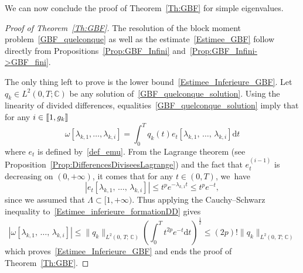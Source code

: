 \documentclass[11pt]{article}
\theoremstyle{definition}
\numberwithin{equation}{section}
\numberwithin{figure}{section}
\numberwithin{table}{section}
\newcommand{\llbracket}{\mathopen{[\mkern -2.7mu[}}
\newcommand{\rrbracket}{\mathclose{]\mkern -2.7mu]}}
\newcommand{\inter}[2]{\llbracket #1,#2 \rrbracket}
\newcommand{\n}{g}
\newcommand{\C}{\mathbb{C}}
\newcommand{\md}{\mathrm{d}}
\begin{document}
We can now conclude the proof of Theorem~\ref{Th:GBF} for simple eigenvalues.
\begin{proof}[Proof of Theorem~\ref{Th:GBF}]
The resolution of the block moment problem~\eqref{GBF_quelconque} as well as the estimate~\eqref{Estimee_GBF} follow directly from Propositions~\ref{Prop:GBF_Infini} and~\ref{Prop:GBF_Infini->GBF_fini}.

The only thing left to prove is the lower bound~\eqref{Estimee_Inferieure_GBF}. Let $q_k \in L^2(0,T;\C)$ be any solution of~\eqref{GBF_quelconque_solution}. Using the linearity of divided differences, equalities~\eqref{GBF_quelconque_solution} imply that for any $i \in \inter{1}{\n_k}$
\begin{equation}\label{Estimee_inferieure_formationDD}
\omega[\lambda_{k,1}, \dots, \lambda_{k,i}] = \int_0^T q_k(t) e_t[\lambda_{k,1},\,\dots,\, \lambda_{k,i}] \md t
\end{equation}
where $e_t$ is defined by~\eqref{def_emu}. From the Lagrange theorem (see Proposition~\ref{Prop:DifferencesDiviseesLagrange}) and the fact that $e_t^{(i-1)}$ is decreasing on $(0,+\infty)$, it comes that for any $t \in (0,T)$, we~have
\[
\left| e_t[\lambda_{k,1},\,\dots,\, \lambda_{k,i}] \right|\leq t^p e^{-\lambda_{k,1} t} \leq t^p e^{-t},
\]
since we assumed that $\Lambda\subset [1,+\infty)$. Thus applying the Cauchy--Schwarz inequality to~\eqref{Estimee_inferieure_formationDD} gives
\[
\left| \omega[\lambda_{k,1},\,\dots,\, \lambda_{k,i}] \right| \leq \| q_k \|_{L^2(0,\,T;\,\C)} \left(\int_0^T t^{2p} e^{-t} \md t\right)^{\frac{1}{2}} \leq (2p)! \| q_k \|_{L^2(0,\,T;\,\C)}
\]
which proves~\eqref{Estimee_Inferieure_GBF} and ends the proof of Theorem~\ref{Th:GBF}.
\end{proof}
\end{document}
